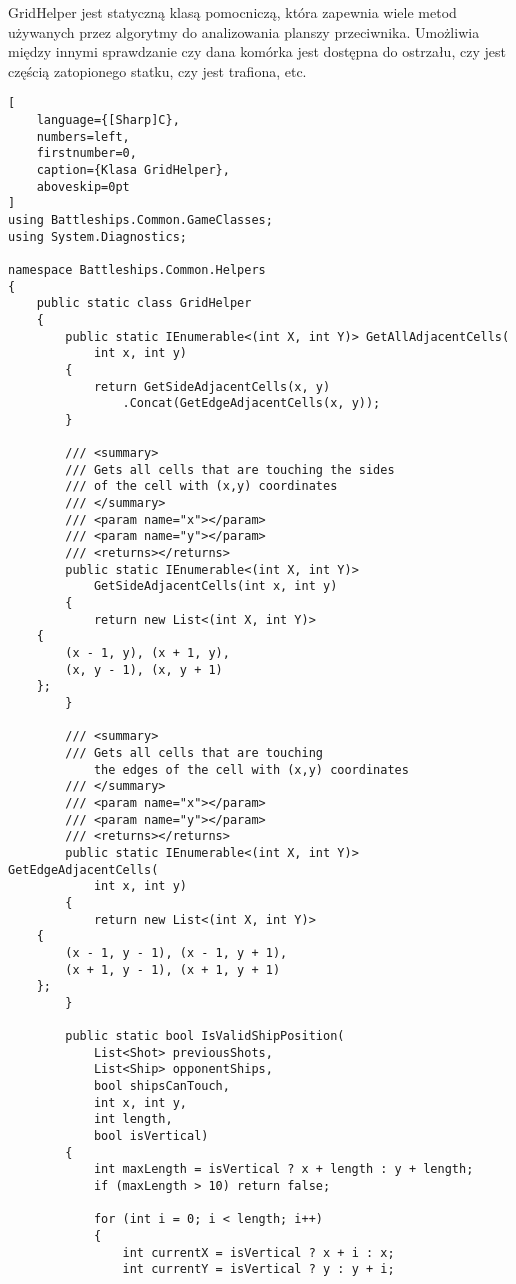 GridHelper jest statyczną klasą pomocniczą, która zapewnia wiele metod używanych przez algorytmy do analizowania planszy przeciwnika. Umożliwia między innymi sprawdzanie czy dana komórka jest dostępna do ostrzału, czy jest częścią zatopionego statku, czy jest trafiona, etc.

\begin{addmargin}[0mm]{0mm}
\begin{lstlisting}[
    language={[Sharp]C},
    numbers=left,
    firstnumber=0,
    caption={Klasa GridHelper},
    aboveskip=0pt
]
using Battleships.Common.GameClasses;
using System.Diagnostics;

namespace Battleships.Common.Helpers
{
    public static class GridHelper
    {
        public static IEnumerable<(int X, int Y)> GetAllAdjacentCells(
            int x, int y)
        {
            return GetSideAdjacentCells(x, y)
                .Concat(GetEdgeAdjacentCells(x, y));
        }

        /// <summary>
        /// Gets all cells that are touching the sides
        /// of the cell with (x,y) coordinates
        /// </summary>
        /// <param name="x"></param>
        /// <param name="y"></param>
        /// <returns></returns>
        public static IEnumerable<(int X, int Y)> 
            GetSideAdjacentCells(int x, int y)
        {
            return new List<(int X, int Y)>
    {
        (x - 1, y), (x + 1, y),
        (x, y - 1), (x, y + 1)
    };
        }

        /// <summary>
        /// Gets all cells that are touching
            the edges of the cell with (x,y) coordinates
        /// </summary>
        /// <param name="x"></param>
        /// <param name="y"></param>
        /// <returns></returns>
        public static IEnumerable<(int X, int Y)> GetEdgeAdjacentCells(
            int x, int y)
        {
            return new List<(int X, int Y)>
    {
        (x - 1, y - 1), (x - 1, y + 1),
        (x + 1, y - 1), (x + 1, y + 1)
    };
        }

        public static bool IsValidShipPosition(
            List<Shot> previousShots,
            List<Ship> opponentShips,
            bool shipsCanTouch,
            int x, int y,
            int length,
            bool isVertical)
        {
            int maxLength = isVertical ? x + length : y + length;
            if (maxLength > 10) return false;

            for (int i = 0; i < length; i++)
            {
                int currentX = isVertical ? x + i : x;
                int currentY = isVertical ? y : y + i;


\end{lstlisting}
\end{addmargin}
